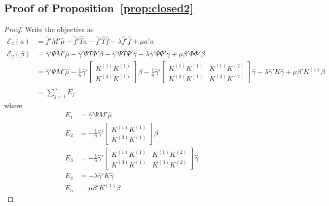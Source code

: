 \subsection{Proof of Proposition~\ref{prop:closed2}}

\begin{proof}
Write the objective as 
\begin{align}
    \mathcal{E}_2(a)&=\hat{f}' M' \hat{\mu} -\hat{f}'\hat{T} a- \hat{f}' \hat{T} \hat{f}-\lambda \hat{f}' \hat{f}+\mu a'a \\
    \mathcal{E}_2(\beta)
    &=\hat{\gamma}'\Psi M'\hat{\mu}-\hat{\gamma}'\Psi\hat{T}\Phi'\beta- \hat{\gamma}'\Psi\hat{T}\Psi'\hat{\gamma}-\lambda \hat{\gamma}'\Psi\Psi'\hat{\gamma}+\mu \beta'\Phi\Phi'\beta \\
    &=\hat{\gamma}'\Psi M'\hat{\mu}
    -\frac{1}{n}\hat{\gamma}'\begin{bmatrix} K^{(1)} K^{(1)} \\ K^{(3)} K^{(1)}\end{bmatrix}\beta
    - \frac{1}{n}\hat{\gamma}'\begin{bmatrix} K^{(1)}K^{(1)} & K^{(1)} K^{(2)} \\ K^{(3)} K^{(1)} & K^{(3)}K^{(2)}\end{bmatrix}\hat{\gamma}
    -\lambda \hat{\gamma}'K\hat{\gamma}
    +\mu \beta'K^{(1)}\beta  \\
    &=\sum_{j=1}^5 E_j
\end{align}
where 
\begin{align}
    E_1&=\hat{\gamma}'\Psi M'\hat{\mu} \\
    E_2&= -\frac{1}{n}\hat{\gamma}'\begin{bmatrix} K^{(1)} K^{(1)} \\ K^{(3)} K^{(1)}\end{bmatrix}\beta \\
    E_3&=- \frac{1}{n}\hat{\gamma}'\begin{bmatrix} K^{(1)}K^{(1)} & K^{(1)} K^{(2)} \\ K^{(3)} K^{(1)} & K^{(3)}K^{(2)}\end{bmatrix}\hat{\gamma} \\
    E_4&= -\lambda \hat{\gamma}'K\hat{\gamma} \\
    E_5&=\mu \beta'K^{(1)}\beta
\end{align}


\end{proof}
